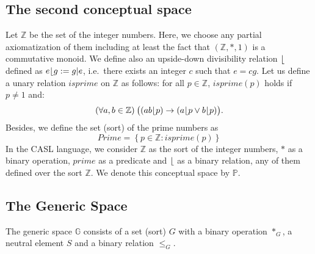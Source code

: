 \subsection{The second conceptual space}
Let $\mathbb{Z}$ be the set of the integer numbers. Here, 
we choose any partial axiomatization of them including at least 
the fact that $(\mathbb{Z},*,1)$ is a
commutative monoid.
We define also an upside-down divisibility relation $\lfloor$ defined as
%
$e\lfloor g:=g|e$,  i.e.\ there exists an integer $c$ such that $e=cg$.
Let us define a unary relation $isprime$ on $\mathbb{Z}$ as
follows: for all $p\in \mathbb{Z}$, $isprime(p)$ holds if $p\neq 1$
and:
%
\[(\forall a,b\in \mathbb{Z})\: \bigl( (ab \lfloor p)\rightarrow (a \lfloor p \vee b \lfloor p) \bigr).\] 
Besides, we define the set (sort) of the prime numbers as 
\[ Prime=\left\{ p\in \mathbb{Z}: isprime(p)\right\}\]
In the CASL language, we consider
$\mathbb{Z}$ as the sort of the integer numbers, $*$ as a binary
operation, $prime$ as a predicate and $\lfloor$ as a binary
relation, any of them defined over the sort $\mathbb{Z}$.
We denote this conceptual space by $\mathbb{P}$.


\subsection{The Generic Space}

The generic space $\mathbb{G}$ consists of a set (sort) $G$ with a
binary operation $*_G$, a neutral element $S$ and a binary relation
$\leq_G$.


